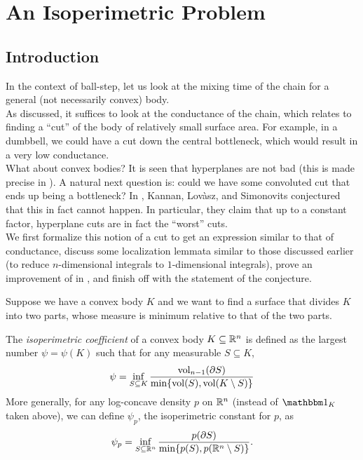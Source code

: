\documentclass{article}
\begin{document}
\thispagestyle{empty}
\titleBC

\tableofcontents

\clearpage

\section{An Isoperimetric Problem}

	\subsection{Introduction}

		In the context of ball-step, let us look at the mixing time of the chain for a general (not necessarily convex) body.\\
		As discussed, it suffices to look at the conductance of the chain, which relates to finding a ``cut'' of the body of relatively small surface area. For example, in a dumbbell, we could have a cut down the central bottleneck, which would result in a very low conductance.\\
		What about convex bodies? It is seen that hyperplanes are not bad (this is made precise in ). A natural next question is: could we have some convoluted cut that ends up being a bottleneck? In \cite{KLSConjecture}, Kannan, Lov\`asz, and Simonovits conjectured that this in fact cannot happen. In particular, they claim that up to a constant factor, hyperplane cuts are in fact the ``worst'' cuts.\\
		We first formalize this notion of a cut to get an expression similar to that of conductance, discuss some localization lemmata similar to those discussed earlier (to reduce $n$-dimensional integrals to $1$-dimensional integrals), prove an improvement of  in , and finish off with the statement of the conjecture.

		Suppose we have a convex body $K$ and we want to find a surface that divides $K$ into two parts, whose measure is minimum relative to that of the two parts.

		\begin{fdef}
			\label{def: isoperimetric coefficient}
			The \textit{isoperimetric coefficient} of a convex body $K\subseteq\mathbb{R}^n$ is defined as the largest number $\psi=\psi(K)$ such that for any measurable $S\subseteq K$,
			\[ \psi = \inf_{S\subseteq K} \frac{\operatorname{vol}_{n-1}(\partial S)}{\min\{\operatorname{vol}(S),\operatorname{vol}(K\setminus S)\}} \]
			More generally, for any log-concave density $p$ on $\mathbb{R}^n$ (instead of $\indic_K$ taken above), we can define $\psi_p$, the isoperimetric constant for $p$, as
			\[ \psi_p = \inf_{S\subseteq\mathbb{R}^n} \frac{p(\partial S)}{\min\{p(S),p(\mathbb{R}^n\setminus S)\}}. \]
		\end{fdef}
\end{document}
